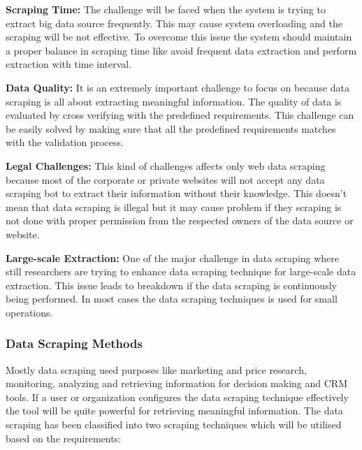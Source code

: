 {\bf Scraping Time:} The challenge will be faced when the system is trying to extract big data source frequently. This may cause system overloading and the scraping will be not effective. To overcome this issue the system should maintain a proper balance in scraping time like avoid frequent data extraction and perform extraction with time interval.

{\bf Data Quality:} It is an extremely important challenge to focus on because data scraping is all about extracting meaningful information. The quality of data is evaluated by cross verifying with the predefined requirements. This challenge can be easily solved by making sure that all the predefined requirements matches with the validation process.

{\bf Legal Challenges:} This kind of challenges affects only web data scraping because most of the corporate or private websites will not accept any data scraping bot to extract their information without their knowledge. This doesn't mean that data scraping is illegal but it may cause problem if they scraping is not done with proper permission from the respected owners of the data source or website.

{\bf Large-scale Extraction:} One of the major challenge in data scraping where still researchers are trying to enhance data scraping technique for large-scale data extraction. This issue leads to breakdown if the data scraping is continuously being performed. In most cases the data scraping techniques is used for small operations.
 
%
%
\subsubsection{Data Scraping Methods}
Mostly data scraping used purposes like marketing and price research, monitoring, analyzing and retrieving information for decision making and CRM tools. If a user or organization configures the data scraping technique effectively the tool will be quite powerful for retrieving meaningful information. The data scraping has been classified into two scraping techniques which will be utilised based on the requirements:

